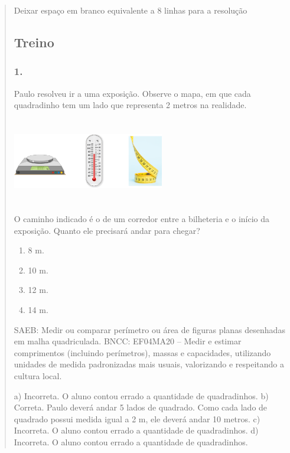 \begin{enumerate}
\begin{escolha}
\begin{enumerate}
\begin{itemize}
\begin{itemize}
\begin{escolha}
\begin{quote}
\Paulo Deixar espaço em branco equivalente a 8 linhas para a resolução



\subsection{Treino}\label{treino-4}

\subsubsection{1.}\label{section-62}

Paulo resolveu ir a uma exposição. Observe o mapa, em que cada quadradinho tem um lado que representa 2 metros na realidade.

\includegraphics[width=2.60897in,height=1.46587in]{media/image70.png}

O caminho indicado é o de um corredor entre a bilheteria e o início da exposição.
Quanto ele precisará andar para chegar?

\begin{enumerate}
\def\labelenumi{\alph{enumi})}
\item
  8 m.
\item
  10 m.
\item
  12 m.
\item
  14 m.
\end{enumerate}

SAEB: Medir ou comparar perímetro ou área de figuras planas desenhadas em malha quadriculada.
BNCC: EF04MA20 -- Medir e estimar comprimentos (incluindo perímetros), massas e capacidades, utilizando
unidades de medida padronizadas mais usuais, valorizando e respeitando a cultura local.

a) Incorreta. O aluno contou errado a quantidade de quadradinhos.
b) Correta. Paulo deverá andar 5 lados de quadrado. Como cada lado de quadrado possui medida igual a 2 m, ele deverá andar 10 metros.
c) Incorreta. O aluno contou errado a quantidade de quadradinhos.
d) Incorreta. O aluno contou errado a quantidade de quadradinhos.



\end{quote}
\end{escolha}
\end{itemize}
\end{itemize}
\end{enumerate}
\end{escolha}
\end{enumerate}
